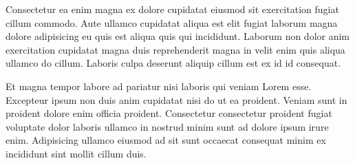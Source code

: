 \documentclass[a4paper,10pt,french]{sphinxmanual}
\begin{document}
Consectetur ea enim magna ex dolore cupidatat eiusmod sit exercitation fugiat cillum commodo. Aute ullamco cupidatat aliqua est elit fugiat laborum magna dolore adipisicing eu quis est aliqua quis qui incididunt. Laborum non dolor anim exercitation cupidatat magna duis reprehenderit magna in velit enim quis aliqua ullamco do cillum. Laboris culpa deserunt aliquip cillum est ex id id consequat.

Et magna tempor labore ad pariatur nisi laboris qui veniam Lorem esse. Excepteur ipsum non duis anim cupidatat nisi do ut ea proident. Veniam sunt in proident dolore enim officia proident. Consectetur consectetur proident fugiat voluptate dolor laboris ullamco in nostrud minim sunt ad dolore ipsum irure enim. Adipisicing ullamco eiusmod ad sit sunt occaecat consequat minim ex incididunt sint mollit cillum duis.



\renewcommand{\indexname}{Index}
\footnotesize\raggedright\printindex
\end{document}
